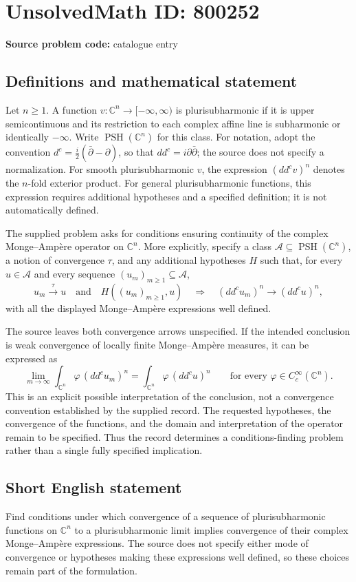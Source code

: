 \documentclass[11pt]{article}
\newcommand{\C}{\mathbb{C}}
\begin{document}
\section*{UnsolvedMath ID: 800252}
\textbf{Source problem code:} catalogue entry
\subsection{Definitions and mathematical statement}
Let \(n\geq 1\). A function \(v:\C^n\to[-\infty,\infty)\) is plurisubharmonic if it is upper semicontinuous and its restriction to each complex affine line is subharmonic or identically \(-\infty\). Write \(\operatorname{PSH}(\C^n)\) for this class. For notation, adopt the convention \(d^c=\tfrac{i}{2}(\bar\partial-\partial)\), so that \(dd^c=i\partial\bar\partial\); the source does not specify a normalization. For smooth plurisubharmonic \(v\), the expression \((dd^c v)^n\) denotes the \(n\)-fold exterior product. For general plurisubharmonic functions, this expression requires additional hypotheses and a specified definition; it is not automatically defined.

The supplied problem asks for conditions ensuring continuity of the complex Monge--Amp\`ere operator on \(\C^n\). More explicitly, specify a class \(\mathcal A\subseteq\operatorname{PSH}(\C^n)\), a notion of convergence \(\tau\), and any additional hypotheses \(H\) such that, for every \(u\in\mathcal A\) and every sequence \((u_m)_{m\geq1}\subseteq\mathcal A\),
\[
 u_m\xrightarrow{\tau}u\quad\text{and}\quad H((u_m)_{m\geq1},u)
 \quad\Longrightarrow\quad
 (dd^c u_m)^n\longrightarrow(dd^c u)^n,
\]
with all the displayed Monge--Amp\`ere expressions well defined.

The source leaves both convergence arrows unspecified. If the intended conclusion is weak convergence of locally finite Monge--Amp\`ere measures, it can be expressed as
\[
 \lim_{m\to\infty}\int_{\C^n}\varphi\,(dd^c u_m)^n
 =\int_{\C^n}\varphi\,(dd^c u)^n
 \qquad\text{for every }\varphi\in C_c^\infty(\C^n).
\]
This is an explicit possible interpretation of the conclusion, not a convergence convention established by the supplied record. The requested hypotheses, the convergence of the functions, and the domain and interpretation of the operator remain to be specified. Thus the record determines a conditions-finding problem rather than a single fully specified implication.
\subsection{Short English statement}
Find conditions under which convergence of a sequence of plurisubharmonic functions on \(\C^n\) to a plurisubharmonic limit implies convergence of their complex Monge--Amp\`ere expressions. The source does not specify either mode of convergence or hypotheses making these expressions well defined, so these choices remain part of the formulation.
\end{document}
